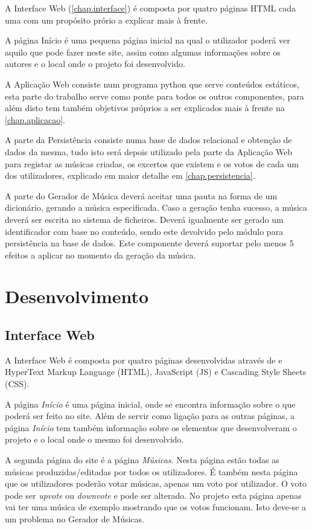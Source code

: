 \documentclass{report}
\begin{document}
A Interface Web (\autoref{chap.interface}) é composta por quatro páginas HTML cada uma com um propósito prório a explicar mais à frente.

A página Início é uma pequena página inicial na qual o utilizador poderá ver aquilo que pode fazer neste site, assim como algumas informações sobre os autores e o local onde o projeto foi desenvolvido.
	
A Aplicação Web consiste num programa python que serve conteúdos estáticos, esta parte do trabalho serve como ponte para todos os outros componentes, para além disto tem também objetivos próprios a ser 
explicados mais à frente na \autoref{chap.aplicacao}.

A parte da Persistência consiste numa base de dados relacional e obtenção de dados da mesma, tudo isto será depois utilizado pela parte da Aplicação Web para registar as músicas criadas, os excertos que existem e os votos de cada um dos utilizadores, explicado em maior detalhe em \autoref{chap.persistencia}.

A parte do Gerador de Música deverá aceitar uma pauta na forma de um dicionário, gerando a música
especificada. Caso a geração tenha sucesso, a música deverá ser escrita no sistema de ficheiros. Deverá igualmente ser gerado um identificador com base no conteúdo, sendo este devolvido pelo módulo para persistência na base de dados. Este componente deverá suportar pelo menos 5 efeitos a aplicar no momento da geração
da música.

\chapter{Desenvolvimento}
\label{chap.desenvolvimento}
	
\section{Interface Web}
\label{chap.interface}
A Interface Web é composta por quatro páginas desenvolvidas através de e HyperText Markup Language (HTML), JavaScript (JS) e Cascading Style Sheets (CSS). 

A página \textit{Início} é uma página inicial, onde se encontra informação sobre o que poderá ser feito no site. Além de servir como ligação para as outras páginas, a página \textit{Início} tem também informação sobre os elementos que desenvolveram o projeto e o local onde o mesmo foi desenvolvido.

A segunda página do site é a página \textit{Músicas}. Nesta página estão todas as músicas produzidas/editadas por todos os utilizadores. É também nesta página que os utilizadores poderão votar músicas, apenas um voto por utilizador. O voto pode ser \textit{upvote} ou \textit{downvote} e pode ser alterado. 
No projeto esta página apenas vai ter uma música de exemplo mostrando que os votos funcionam. Isto deve-se a um problema no Gerador de Músicas.
\end{document}

